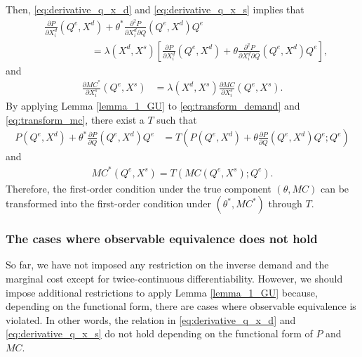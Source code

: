 \documentclass[11pt, a4paper]{article}
\theoremstyle{remark}
\begin{document}
Then, \eqref{eq:derivative_q_x_d} and \eqref{eq:derivative_q_x_s} implies that 
\begin{align}
    &\frac{\partial P}{\partial X^{d}_{i}}(Q^e, X^{d}) + \theta^{*}\frac{\partial^2 P}{\partial X^{d}_{i}\partial Q}(Q^e, X^{d})Q^e \\
    &\hspace{2cm} = \lambda(X^{d}, X^{s})\left[\frac{\partial P}{\partial X^{d}_{i}} (Q^e, X^{d})+ \theta \frac{\partial^2 P}{\partial X^{d}_{i}\partial Q}(Q^e, X^{d})Q^e\right],\label{eq:transform_demand}
\end{align}
and
\begin{align}
    \frac{\partial MC^{*}}{\partial X^{s}_{i}}(Q^e, X^{s}) & = \lambda(X^{d}, X^{s})\frac{\partial MC}{\partial X^{s}_{i}}(Q^e, X^{s}).\label{eq:transform_mc}
\end{align}
By applying Lemma \ref{lemma_1_GU} to \eqref{eq:transform_demand} and \eqref{eq:transform_mc}, there exist a $T$ such that
\begin{align}
    P(Q^e, X^{d}) + \theta^{*} \frac{\partial P}{\partial Q}(Q^e, X^{d}) Q^e & = T\left(P(Q^e, X^{d}) + \theta \frac{\partial P}{\partial Q}(Q^e, X^{d}) Q^e; Q^e\right) \label{eq:transformation_T_demand}
\end{align}
and
\begin{align}
    MC^{*}(Q^e, X^{s}) = T(MC(Q^e, X^{s}); Q^e). \label{eq:transformation_T_mc}
\end{align}
Therefore, the first-order condition under the true component $(\theta, MC)$ can be transformed into the first-order condition under $(\theta^*, MC^*)$ through $T$.


\subsubsection{The cases where observable equivalence does not hold}
So far, we have not imposed any restriction on the inverse demand and the marginal cost except for twice-continuous differentiability.
However, we should impose additional restrictions to apply Lemma \ref{lemma_1_GU} because, depending on the functional form, there are cases where observable equivalence is violated.
In other words, the relation in \eqref{eq:derivative_q_x_d} and \eqref{eq:derivative_q_x_s} do not hold depending on the functional form of $P$ and $MC$.
\end{document}
